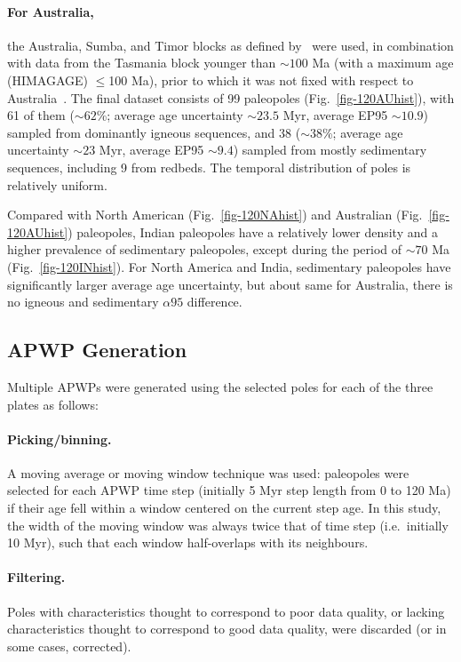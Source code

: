\paragraph{For Australia,}
the Australia, Sumba, and Timor blocks as defined by~\citet{Y18} were used, in
combination with data from the Tasmania block younger than ${\sim}100$ Ma (with
a maximum age (HIMAGAGE) $\leq$100 Ma), prior to which it was not fixed with
respect to Australia~\citep{Y18}. The final dataset consists of 99 paleopoles
(Fig.~\ref{fig-120AUhist}), with 61 of them (${\sim}62$\%; average age
uncertainty ${\sim}23.5$ Myr, average EP95 ${\sim}10.9$\degree) sampled from
dominantly igneous sequences, and 38 (${\sim}38$\%; average age uncertainty
${\sim}23$ Myr, average EP95 ${\sim}9.4$\degree) sampled from mostly sedimentary
sequences, including 9 from redbeds. The temporal distribution of poles is
relatively uniform.

\bigskip
Compared with North American (Fig.~\ref{fig-120NAhist}) and Australian
(Fig.~\ref{fig-120AUhist}) paleopoles, Indian paleopoles have a relatively lower
density and a higher prevalence of sedimentary paleopoles, except during the
period of ${\sim}70$ Ma (Fig.~\ref{fig-120INhist}). For North
America and India, sedimentary paleopoles have significantly larger average age
uncertainty, but about same for Australia, there is no igneous and sedimentary
${\alpha}95$ difference.

\subsection{APWP Generation}\label{sec:apwpg}

Multiple APWPs were generated using the selected poles for each of the three
plates as follows:

\paragraph{Picking/binning.} A moving average or moving window technique was
used: paleopoles were selected for each APWP time step (initially 5 Myr step
length from 0 to 120 Ma) if their age fell within a window centered on the
current step age. In this study, the width of the moving window was always twice
that of time step (i.e.\ initially 10 Myr), such that each window half-overlaps
with its neighbours.

\paragraph{Filtering.} Poles with characteristics thought to correspond to
poor data quality, or lacking characteristics thought to correspond to good
data quality, were discarded (or in some cases, corrected).

